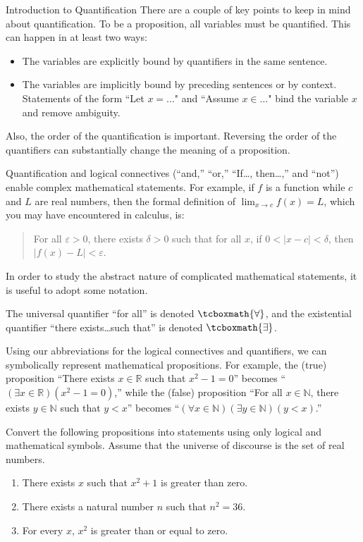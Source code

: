 \begin{section}{Introduction to Quantification}
There are a couple of key points to keep in mind about quantification. To be a proposition, all variables must be quantified.  This can happen in at least two ways:
\begin{itemize}
\item The variables are explicitly bound by quantifiers in the same sentence.
\item The variables are implicitly bound by preceding sentences or by context. Statements of the form ``Let $x=\ldots$" and ``Assume $x\in\ldots$" bind the variable $x$ and remove ambiguity.
\end{itemize}
Also, the order of the quantification is important.  Reversing the order of the quantifiers can substantially change the meaning of a proposition.

Quantification and logical connectives (``and,'' ``or,'' ``If\ldots, then\ldots,'' and ``not'') enable complex mathematical statements. For example, if $f$ is a function while $c$ and $L$ are real numbers, then the formal definition of $\lim_{x\to c}f(x)=L$, which you may have encountered in calculus, is:
\begin{quote}
For all $\varepsilon >0$, there exists $\delta >0$ such that for all $x$, if $0<|x-c|<\delta$, then $|f(x)-L|<\varepsilon$.
\end{quote}

In order to study the abstract nature of complicated mathematical statements, it is useful to adopt some notation.

\begin{definition}\label{def:quantifiers}
The universal quantifier ``for all'' is denoted $\tcboxmath{\forall}$, and the existential quantifier  ``there exists\ldots such that'' is denoted $\tcboxmath{\exists}$.
\end{definition}

Using our abbreviations for the logical connectives and quantifiers, we can symbolically represent mathematical propositions. For example, the (true) proposition ``There exists $x \in \mathbb{R}$ such that $x^2-1=0$'' becomes ``$(\exists x \in \mathbb{R})(x^2-1=0)$,'' while the (false) proposition ``For all $x\in \mathbb{N}$, there exists $y\in\mathbb{N}$ such that $y<x$'' becomes ``$(\forall x\in\mathbb{N})(\exists y\in\mathbb{N})(y<x)$.'' %

\begin{problem}
Convert the following propositions into statements using only logical and mathematical symbols.  Assume that the universe of discourse is the set of real numbers.
\begin{enumerate}[label=\textrm{(\alph*)}]
\item There exists $x$ such that $x^2+1$ is greater than zero.
\item There exists a natural number $n$ such that $n^2=36$. 
\item For every $x$, $x^2$ is greater than or equal to zero.
\end{enumerate}
\end{problem}


\end{section}
